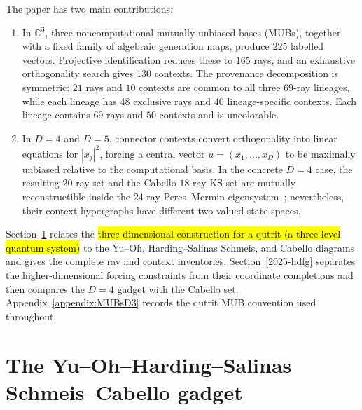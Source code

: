 \documentclass[%
  reprint,
  superscriptaddress,
  showpacs,
  showkeys,
  amsmath,amssymb,
  pra,
  longbibliography,
  floatfix,
  x11names
]{revtex4-2}
\newenvironment{revision}{\begingroup}{\endgroup}
\newcommand{\corr}[1]{{\color{red}\hl{#1}}}
\begin{document}
\begin{revision}
The paper has two main contributions:
\begin{enumerate}
\item In $\mathbb{C}^3$, three noncomputational mutually unbiased bases (MUBs), together with a fixed family of algebraic generation maps, produce $225$ labelled vectors.  Projective identification reduces these to $165$ rays, and an exhaustive orthogonality search gives $130$ contexts.  The provenance decomposition is symmetric: $21$ rays and $10$ contexts are common to all three $69$-ray lineages, while each lineage has $48$ exclusive rays and $40$ lineage-specific contexts.  Each lineage contains $69$ rays and $50$ contexts and is uncolorable.
\item In $D=4$ and $D=5$, connector contexts convert orthogonality into linear equations for $|x_j|^2$, forcing a central vector $u=(x_1,\ldots,x_D)$ to be maximally unbiased relative to the computational basis.  In the concrete $D=4$ case, the resulting $20$-ray set and the Cabello $18$-ray KS set are mutually reconstructible inside the $24$-ray Peres--Mermin eigensystem~\cite{peres111,mermin90b,peres-91,pavicic-2004ksafq,cabello-96}; nevertheless, their context hypergraphs have different two-valued-state spaces.
\end{enumerate}

Section~\ref{2025-yohscg} relates the
\corr{three-dimensional construction for a qutrit (a three-level quantum system)}
to the Yu--Oh, Harding--Salinas Schmeis, and Cabello diagrams and gives the complete ray and context inventories.  Section~\ref{2025-hdfg} separates the higher-dimensional forcing constraints from their coordinate completions and then compares the $D=4$ gadget with the Cabello set.  Appendix~\ref{appendix:MUBsD3} records the qutrit MUB convention used throughout.
\end{revision}


\section{The Yu--Oh--Harding--Salinas Schmeis--Cabello gadget}
\label{2025-yohscg}
\end{document}
